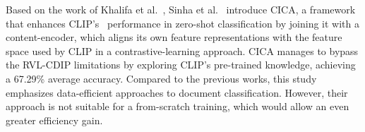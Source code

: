 Based on the work of Khalifa et al.~\cite{khalifa_contrastive_2023}, Sinha et al.~\cite{sinha_cica_2024} introduce CICA, a framework that enhances CLIP's~\cite{radford_learning_2021} performance in zero-shot classification by joining it with a content-encoder, which aligns its own feature representations with the feature space used by CLIP in a contrastive-learning approach. CICA manages to bypass the \gls{RVL-CDIP} limitations by exploring CLIP's pre-trained knowledge, achieving a 67.29\% average accuracy. Compared to the previous works, this study emphasizes data-efficient approaches to document classification. However, their approach is not suitable for a from-scratch training, which would allow an even greater efficiency gain.
